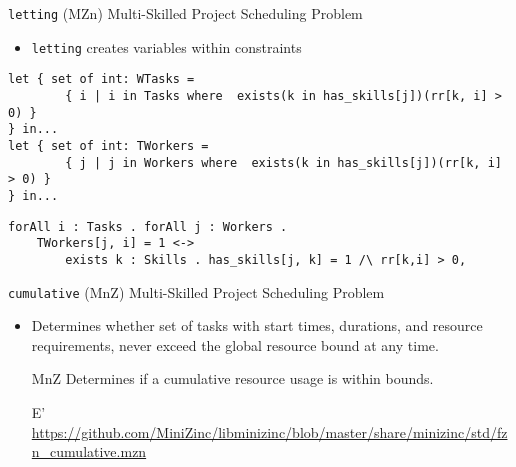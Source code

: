 \documentclass{beamer}
\begin{document}
\begin{frame}[containsverbatim]{\texttt{letting} (MZn)}
Multi-Skilled Project Scheduling Problem
\begin{itemize}
    \item \texttt{letting} creates variables within constraints
\end{itemize}
\begin{lstlisting}[basicstyle=\tiny, language=minizinc]
let { set of int: WTasks =
        { i | i in Tasks where  exists(k in has_skills[j])(rr[k, i] > 0) }
} in...
let { set of int: TWorkers = 
        { j | j in Workers where  exists(k in has_skills[j])(rr[k, i] > 0) }
} in...
\end{lstlisting}
\begin{lstlisting}[basicstyle=\tiny, language=eprime]
forAll i : Tasks . forAll j : Workers .
    TWorkers[j, i] = 1 <-> 
        exists k : Skills . has_skills[j, k] = 1 /\ rr[k,i] > 0,
\end{lstlisting}
\end{frame}


\begin{frame}{\texttt{cumulative} (MnZ)}
Multi-Skilled Project Scheduling Problem
\begin{itemize}
    \item Determines whether set of tasks with start times, durations, and resource requirements, never exceed the global resource bound at any time.
    \item[MnZ] Determines if a cumulative resource usage is within bounds.
    \item[E'] \url{https://github.com/MiniZinc/libminizinc/blob/master/share/minizinc/std/fzn_cumulative.mzn}
\end{itemize}
\end{frame}
\end{document}
